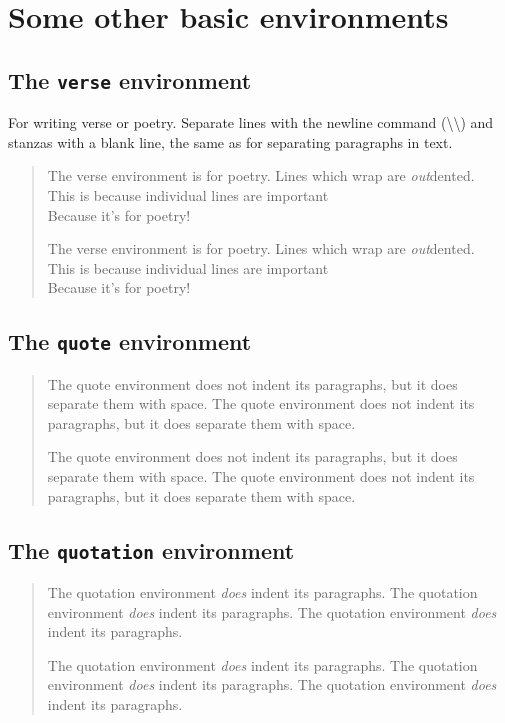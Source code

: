 \documentclass[12pt,a4paper,article]{memoir}
\begin{document}
\chapter*{Some other basic environments}

\section*{The \texttt{verse} environment}

For writing verse or poetry. Separate lines with the newline command (\textbackslash\textbackslash) and stanzas with a blank line, the same as for separating paragraphs in text.

\begin{verse}
The verse environment is for poetry. Lines which wrap are \emph{out}dented.\\
This is because individual lines are important\\
Because it's for poetry!

The verse environment is for poetry. Lines which wrap are \emph{out}dented.\\
This is because individual lines are important\\
Because it's for poetry!
\end{verse}

\section*{The \texttt{quote} environment}

\begin{quote}
The quote environment does not indent its paragraphs, but it does separate them with space. The quote environment does not indent its paragraphs, but it does separate them with space.

The quote environment does not indent its paragraphs, but it does separate them with space. The quote environment does not indent its paragraphs, but it does separate them with space.
\end{quote}

\section*{The \texttt{quotation} environment}

\begin{quotation}
The quotation environment \emph{does} indent its paragraphs. The quotation environment \emph{does} indent its paragraphs. The quotation environment \emph{does} indent its paragraphs.

The quotation environment \emph{does} indent its paragraphs. The quotation environment \emph{does} indent its paragraphs. The quotation environment \emph{does} indent its paragraphs.
\end{quotation}
\end{document}
